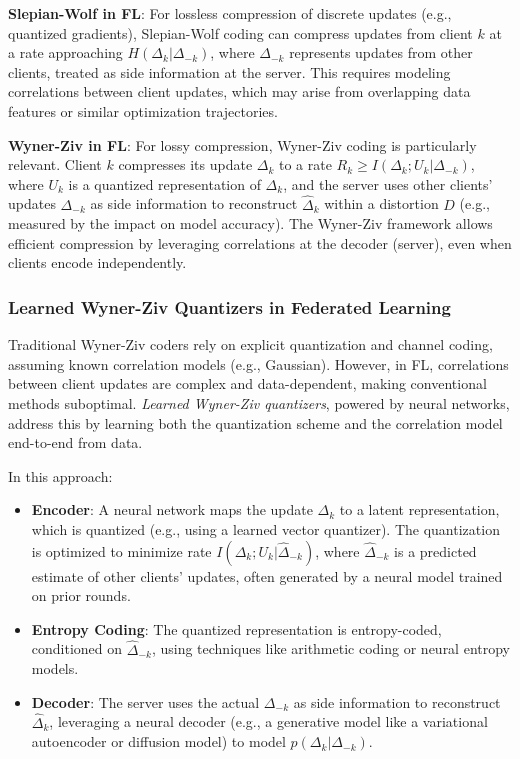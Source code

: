 \textbf{Slepian-Wolf in FL}: For lossless compression of discrete updates (e.g., quantized gradients), Slepian-Wolf coding can compress updates from client $k$ at a rate approaching $H(\Delta_k|\Delta_{-k})$, where $\Delta_{-k}$ represents updates from other clients, treated as side information at the server. This requires modeling correlations between client updates, which may arise from overlapping data features or similar optimization trajectories.

\textbf{Wyner-Ziv in FL}: For lossy compression, Wyner-Ziv coding is particularly relevant. Client $k$ compresses its update $\Delta_k$ to a rate $R_k \geq I(\Delta_k; U_k|\Delta_{-k})$, where $U_k$ is a quantized representation of $\Delta_k$, and the server uses other clients’ updates $\Delta_{-k}$ as side information to reconstruct $\hat{\Delta}_k$ within a distortion $D$ (e.g., measured by the impact on model accuracy). The Wyner-Ziv framework allows efficient compression by leveraging correlations at the decoder (server), even when clients encode independently.

\subsubsection{Learned Wyner-Ziv Quantizers in Federated Learning}

Traditional Wyner-Ziv coders rely on explicit quantization and channel coding, assuming known correlation models (e.g., Gaussian). However, in FL, correlations between client updates are complex and data-dependent, making conventional methods suboptimal. \emph{Learned Wyner-Ziv quantizers}, powered by neural networks, address this by learning both the quantization scheme and the correlation model end-to-end from data.

In this approach:
\begin{itemize}
    \item \textbf{Encoder}: A neural network maps the update $\Delta_k$ to a latent representation, which is quantized (e.g., using a learned vector quantizer). The quantization is optimized to minimize rate $I(\Delta_k; U_k|\hat{\Delta}_{-k})$, where $\hat{\Delta}_{-k}$ is a predicted estimate of other clients’ updates, often generated by a neural model trained on prior rounds.
    \item \textbf{Entropy Coding}: The quantized representation is entropy-coded, conditioned on $\hat{\Delta}_{-k}$, using techniques like arithmetic coding or neural entropy models.
    \item \textbf{Decoder}: The server uses the actual $\Delta_{-k}$ as side information to reconstruct $\hat{\Delta}_k$, leveraging a neural decoder (e.g., a generative model like a variational autoencoder or diffusion model) to model $p(\Delta_k|\Delta_{-k})$.
\end{itemize}

